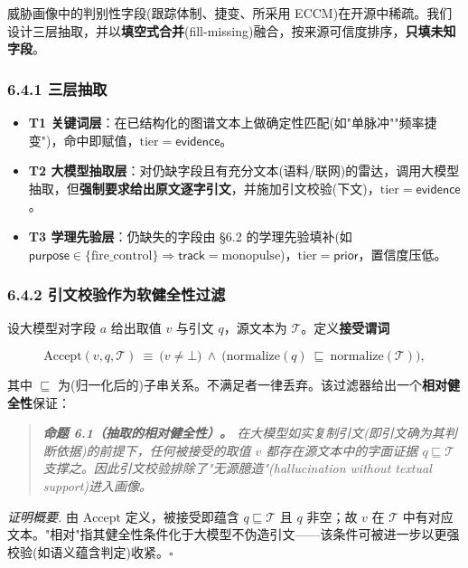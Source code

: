 \documentclass[12pt,a4paper]{ctexart}
\begin{document}
威胁画像中的判别性字段(跟踪体制、捷变、所采用 ECCM)在开源中稀疏。我们设计三层抽取，并以\textbf{填空式合并}(fill-missing)融合，按来源可信度排序，\textbf{只填未知字段}。

\subsubsection*{6.4.1 三层抽取}

\begin{itemize}[leftmargin=2em]
\item \textbf{T1 关键词层}：在已结构化的图谱文本上做确定性匹配(如"单脉冲""频率捷变")，命中即赋值，$\mathrm{tier}=\textsf{evidence}$。
\item \textbf{T2 大模型抽取层}：对仍缺字段且有充分文本(语料/联网)的雷达，调用大模型抽取，但\textbf{强制要求给出原文逐字引文}，并施加引文校验(下文)，$\mathrm{tier}=\textsf{evidence}$。
\item \textbf{T3 学理先验层}：仍缺失的字段由 §6.2 的学理先验填补(如 $\mathsf{purpose}\in\{\text{fire\_control}\}\Rightarrow\mathsf{track}=\text{monopulse}$)，$\mathrm{tier}=\textsf{prior}$，置信度压低。
\end{itemize}

\subsubsection*{6.4.2 引文校验作为软健全性过滤}

设大模型对字段 $a$ 给出取值 $v$ 与引文 $q$，源文本为 $\mathcal{T}$。定义\textbf{接受谓词}

\[\mathrm{Accept}(v,q,\mathcal{T})\ \equiv\ \big(v\ne\bot\big)\ \wedge\ \big(\mathrm{normalize}(q)\ \sqsubseteq\ \mathrm{normalize}(\mathcal{T})\big),\]

其中 $\sqsubseteq$ 为(归一化后的)子串关系。不满足者一律丢弃。该过滤器给出一个\textbf{相对健全性}保证：

\begin{quote}\itshape \textbf{命题 6.1（抽取的相对健全性）。} 在大模型如实复制引文(即引文确为其判断依据)的前提下，任何被接受的取值 $v$ 都存在源文本中的字面证据 $q\sqsubseteq\mathcal{T}$ 支撑之。因此引文校验排除了"无源臆造"(hallucination without textual support)进入画像。\end{quote}

\textit{证明概要.} 由 $\mathrm{Accept}$ 定义，被接受即蕴含 $q\sqsubseteq\mathcal{T}$ 且 $q$ 非空；故 $v$ 在 $\mathcal{T}$ 中有对应文本。"相对"指其健全性条件化于大模型不伪造引文——该条件可被进一步以更强校验(如语义蕴含判定)收紧。$\square$
\end{document}
